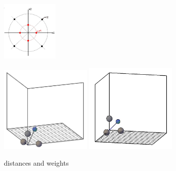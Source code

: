 \documentclass[11pt]{beamer}
\begin{document}
\begin{frame}
\begin{figure}[h]
	\centering
	\includegraphics[width=0.25\textwidth]{2dconjaxis.jpg}
\end{figure}
\begin{figure}[h]
	\centering
	\includegraphics[width=0.4\textwidth]{4thmoment3d1.jpg}
	\includegraphics[width=0.4\textwidth]{4thmoment3d3.jpg}
	\caption{distances and weights}
\end{figure}
\end{frame}
\end{document}
